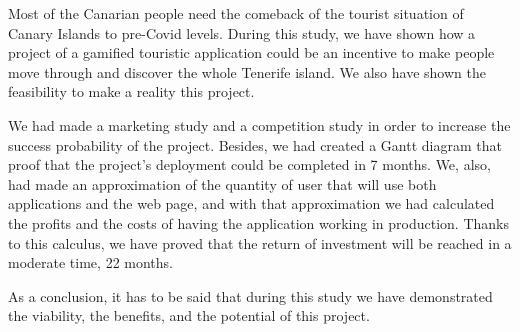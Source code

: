 Most of the Canarian people need the comeback of the tourist situation of Canary Islands to pre-Covid levels. 
During this study, we have shown how a project of a gamified touristic application could be an incentive to make people move through and discover the whole Tenerife island. We also have shown the feasibility to make a reality this project.

We had made a marketing study and a competition study in order to increase the success probability of the project. Besides, we had created a Gantt diagram that proof that the project's deployment could be completed in 7 months. We, also, had made an approximation of the quantity of user that will use both applications and the web page, and with that approximation we had calculated the profits and the costs of having the application working in production. Thanks to this calculus, we have proved that the return of investment will be reached in a moderate time, 22 months.

As a conclusion, it has to be said that during this study we have demonstrated the viability, the benefits, and the potential of this project.

